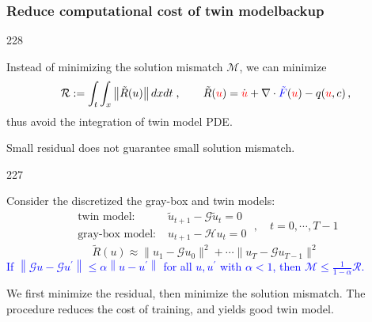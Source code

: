 \documentclass{beamer}
\newcommand{\barrow}{\item[\color{darkred}\ding{228}]}
\newcommand{\carrow}{\item[\color{darkred}\ding{227}]}
\begin{document}
\begin{frame}
    \frametitle{Reduce computational cost of twin model\hfill\scriptsize{backup}}\small
    \begin{dinglist}{228}
        \barrow Instead of minimizing the solution mismatch $\mathcal{M}$, we can minimize
        $$  \mathcal{R} :=
            \int_t\int_x \left\|\tilde{R}(u)\right\| dxdt\;,\qquad
            \tilde{R}(\textcolor{red}{u}) = \dot{\textcolor{red}{u}} + \nabla \cdot 
            \textcolor{blue}{\tilde{F}}(\textcolor{red}{u}) - q(\textcolor{red}{u},c)\,,
        $$
        thus avoid the integration of twin model PDE.
        \barrow Small residual does not guarantee small solution mismatch.\scriptsize
        \begin{dinglist}{227}
            \carrow
            Consider the discretized the gray-box and twin models:
            \begin{equation*}\begin{split}
                \textrm{twin model:} &\; \tilde{u}_{t+1} - \mathcal{G}\tilde{u}_{t} = 0\\
                \textrm{gray-box model:}&\; u_{t+1} - \mathcal{H}u_t = 0
            \end{split}\;,\quad
            t = 0,\cdots, T-1
            \end{equation*}
            $$
                \tilde{R}(u) \approx \big\|u_1-\mathcal{G}u_0\big\|^2 + \cdots \big\|u_T-\mathcal{G}u_{T-1}
                \big\|^2
            $$
            \textcolor{blue}{
            If $\left\|\mathcal{G}u-\mathcal{G}u^\prime\right\| \le \alpha \left\|u-u^\prime\right\| $ 
            for all $u, u^\prime$ with $\alpha <1$, then
            $\mathcal{M} \le \frac{1}{1-\alpha} \mathcal{R}$.
            }
        \end{dinglist}
        \small
        \barrow We first minimize the residual, then minimize the solution mismatch.
                The procedure reduces the cost of training, and yields good twin model.
    \end{dinglist}
\end{frame}
\end{document}
